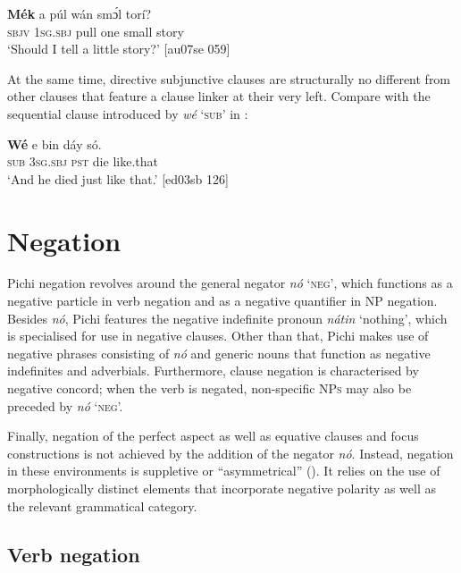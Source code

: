 \ea%
    \label{ex:key:530}
    \gll \textbf{Mék}   a    púl    wán    smɔ́l  torí?\\
\textsc{sbjv}    \textsc{1sg.sbj}  pull    one    small  story\\

\glt ‘Should I tell a little story?’ [au07se 059]
\z

At the same time, directive subjunctive clauses are structurally no different from other clauses that feature a clause linker at their very left. Compare  with the sequential clause introduced by \textit{wé} ‘\textsc{sub}’ in :


\ea%
    \label{ex:key:531}
    \gll \textbf{Wé}  e    bin  dáy  só.\\
\textsc{sub}  \textsc{3sg.sbj}  \textsc{pst}  die  like.that\\

\glt ‘And he died just like that.’ [ed03sb 126]
\z

\section{Negation}\label{sec:7.2}

Pichi negation revolves around the general negator \textit{nó} \textsc{‘neg’,} which functions as a negative particle in verb negation and as a negative quantifier in \textsc{NP} negation. Besides \textit{nó}, Pichi features the negative indefinite pronoun \textit{nátin} ‘nothing’, which is specialised for use in negative clauses. Other than that, Pichi makes use of negative phrases consisting of \textit{nó} and generic nouns that function as negative indefinites and adverbials. Furthermore, clause negation is characterised by negative concord; when the verb is negated, non-specific \textsc{NPs} may also be preceded by \textit{nó} ‘\textsc{neg}’.


Finally, negation of the perfect aspect as well as equative clauses and focus constructions is not achieved by the addition of the negator \textit{nó}. Instead, negation in these environments is suppletive or “asymmetrical” (\citealt[72]{Miestamo2005}). It relies on the use of morphologically distinct elements that incorporate negative polarity as well as the relevant grammatical category.


\subsection{Verb negation}

